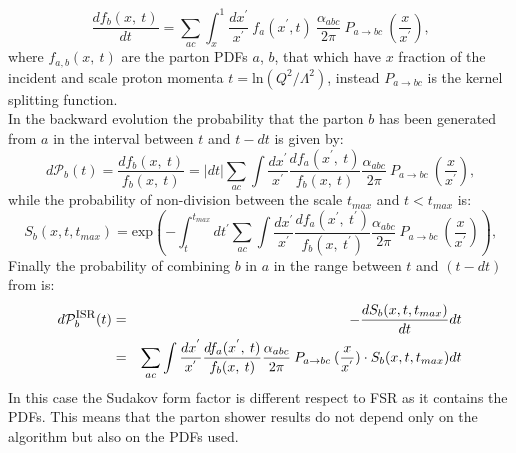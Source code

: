 \begin{equation}
  \frac{d f_b(x, \:t)}{dt}= \sum_{ac} \int_x ^1 \frac{d x^{'}}{x^{'}} \: f_a(x^{'},t) \:\frac{\alpha_{abc}}{2\pi} \:P_{a \rightarrow bc} \:(\frac{x}{x^{'}}) \mbox{,}\end{equation}
where $f_{a,b}(x, \:t)$ are the parton PDFs  $a$, $b$, that which have $ x $ fraction of the incident and scale proton momenta $t=\mbox{ln}(Q^2/ \Lambda^2) $, instead $P_{a \rightarrow bc}$ is the kernel splitting function.\\
In the backward evolution the probability that the parton $ b $ has been generated from $ a $ in the interval between $ t $ and $ t-dt $ is given by:
\begin{equation}
d\mathcal{P}_{b}(t)=\frac{d f_b(x, \:t) }{ f_b(x, \:t)}= |dt| \sum_{ac}  \int  \frac{d x^{'}}{x^{'}} \frac{d f_a(x^{'}, \:t) }{ f_b(x, \:t)} \frac{\alpha_{abc}}{2\pi}          \:P_{a \rightarrow bc} \:(\frac{x}{x^{'}})      \mbox{,}\end{equation}
while the probability of non-division between the scale $t_{max}$ and $t<t_{max}$ is:
\begin{equation}
S_b (x,t,t_{max})=   \mbox{exp} \left( - \int_t ^{t_{max}} dt^{'} \sum_{ac}  \int  \frac{d x^{'}}{x^{'}} \frac{d f_a(x^{'}, \:t^{'}) }{ f_b(x, \:t^{'})} \frac{\alpha_{abc}}{2\pi}          \:P_{a \rightarrow bc} \:(\frac{x}{x^{'}}) \right)     \mbox{,}\end{equation} 
Finally the probability of combining $ b $ in $ a $ in the range between $ t $ and $ (t-dt) $ from is:
\begin{eqnarray}
d \mathcal{P}_{b}^{\mbox{\footnotesize{ISR}}}(t) &=& - \frac{d S_b (x,t,t_{max})}{dt} dt \nonumber \\
&=&  \sum_{ac}  \int  \frac{d x^{'}}{x^{'}} \frac{d f_a(x^{'}, \:t) }{ f_b(x, \:t)} \frac{\alpha_{abc}}{2\pi}          \:P_{a \rightarrow bc} \:(\frac{x}{x^{'}})  \cdot S_b (x,t,t_{max}) dt \end{eqnarray}
In this case the Sudakov  form factor is different respect to FSR as it contains the PDFs.
This means that the parton shower results do not depend only on the algorithm but also on the PDFs used.


